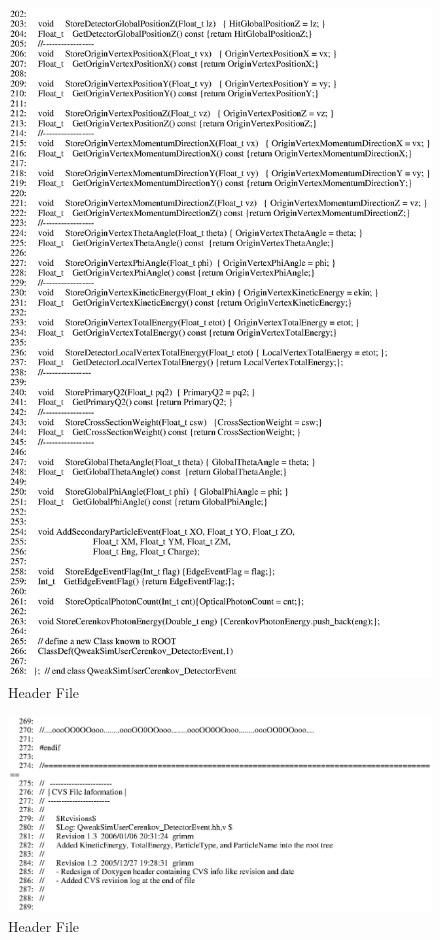 \clearpage

\begin{figure}[ht]
  \hspace{0cm}
  \includegraphics[scale=0.8]{./figures5/QweakSimUserCerenkov_DetectorEvent.hh-p4.eps}
  \caption{\label{SourceV34} Header File}
           \label{fig:V-SC-37}
\end{figure}

\clearpage

\begin{figure}[ht]
  \hspace{0cm}
  \includegraphics[scale=0.8]{./figures5/QweakSimUserCerenkov_DetectorEvent.hh-p5.eps}
  \caption{\label{SourceV35} Header File}
           \label{fig:V-SC-38}
\end{figure}

